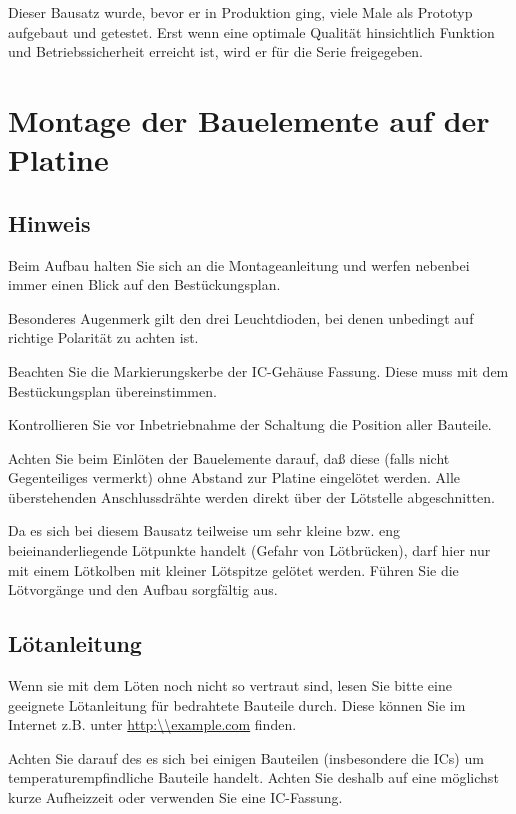\documentclass[fleqn,10pt]{SelfArx} %
\begin{document}
Dieser Bausatz wurde, bevor er in Produktion ging, viele Male als Prototyp aufgebaut und getestet. Erst wenn eine optimale Qualität hinsichtlich Funktion und Betriebssicherheit erreicht ist, wird er für die Serie freigegeben.


\section{Montage der Bauelemente auf der Platine}

 \subsection*{Hinweis}

Beim Aufbau halten Sie sich an die Montageanleitung und werfen nebenbei immer einen Blick auf den Bestückungsplan.

Besonderes Augenmerk gilt den drei Leuchtdioden, bei denen unbedingt auf richtige Polarität zu achten ist.

Beachten Sie die Markierungskerbe der IC-Gehäuse Fassung. Diese muss mit dem Bestückungsplan übereinstimmen.

Kontrollieren Sie vor Inbetriebnahme der Schaltung die Position aller Bauteile.

Achten Sie beim Einlöten der Bauelemente darauf, daß diese (falls nicht Gegenteiliges vermerkt) ohne Abstand zur Platine eingelötet werden. Alle überstehenden Anschlussdrähte werden direkt über der Lötstelle abgeschnitten.

Da es sich bei diesem Bausatz teilweise um sehr kleine bzw. eng beieinanderliegende Lötpunkte handelt (Gefahr von Lötbrücken), darf hier nur mit einem Lötkolben mit kleiner Lötspitze gelötet werden. Führen Sie die Lötvorgänge und den Aufbau sorgfältig aus.

 \subsection*{Lötanleitung}

Wenn sie mit dem Löten noch nicht so vertraut sind, lesen Sie bitte eine geeignete Lötanleitung für bedrahtete Bauteile durch. Diese können Sie im Internet z.B. unter \url{http:\\example.com} finden.

Achten Sie darauf des es sich bei einigen Bauteilen (insbesondere die ICs) um temperaturempfindliche Bauteile handelt. Achten Sie deshalb auf eine möglichst kurze Aufheizzeit oder verwenden Sie eine IC-Fassung.
\end{document}

